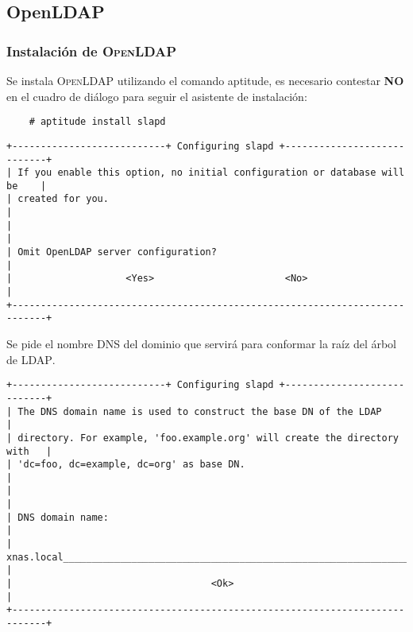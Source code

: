       \subsection {OpenLDAP}

          \subsubsection {Instalaci\'{o}n de \textsc{OpenLDAP}}

Se instala \textsc{OpenLDAP} utilizando el comando aptitude, es necesario contestar \textbf{NO} en el cuadro de di\'{a}logo para seguir el asistente de instalaci\'{o}n:

{
\scriptsize
\linespread{1}
\begin{verbatim}
    # aptitude install slapd
\end{verbatim}
}


{
\scriptsize
\linespread{1}
\begin{verbatim}
+---------------------------+ Configuring slapd +----------------------------+
| If you enable this option, no initial configuration or database will be    |
| created for you.                                                           |
|                                                                            |
| Omit OpenLDAP server configuration?                                        |
|                    <Yes>                       <No>                        |
+----------------------------------------------------------------------------+
\end{verbatim}
}

Se pide el nombre DNS del dominio que servir\'{a} para conformar la ra\'{i}z del \'{a}rbol de \textsc{LDAP}.

{
\scriptsize
\linespread{1}
\begin{verbatim}
+---------------------------+ Configuring slapd +----------------------------+
| The DNS domain name is used to construct the base DN of the LDAP           |
| directory. For example, 'foo.example.org' will create the directory with   |
| 'dc=foo, dc=example, dc=org' as base DN.                                   |
|                                                                            |
| DNS domain name:                                                           |
| xnas.local________________________________________________________________ |
|                                   <Ok>                                     |
+----------------------------------------------------------------------------+
\end{verbatim}
}

